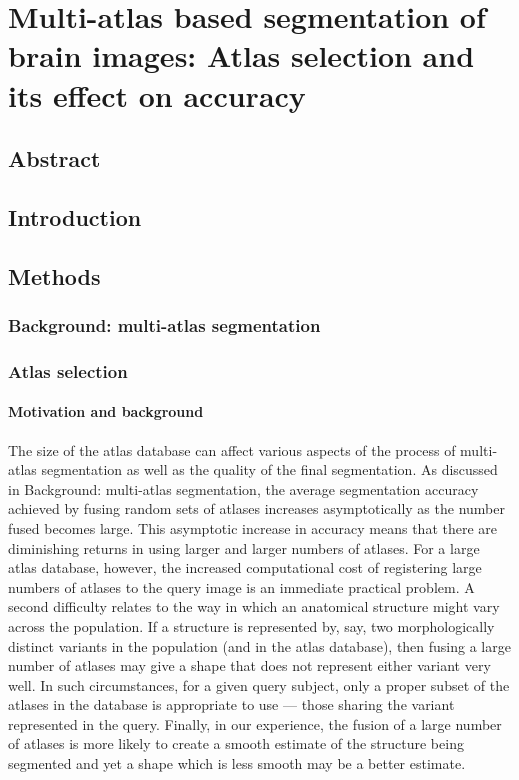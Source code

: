 
\chapter*{Multi-atlas based segmentation of brain images:
Atlas selection and its effect on accuracy}
\section*{Abstract}
\section*{Introduction}
\section*{Methods}
\subsection*{Background: multi-atlas segmentation}
\subsection*{Atlas selection}
\subsubsection*{Motivation and background}
The size of the atlas database can affect
various aspects of the process of multi-atlas segmentation
as well as the quality of the final segmentation.
As discussed in Background: multi-atlas segmentation,
the average segmentation accuracy 
achieved by fusing random sets of atlases increases asymptotically
as the number fused becomes large.
This asymptotic increase in accuracy means that
there are diminishing returns in using larger and larger numbers of atlases.
For a large atlas database, however,
the increased computational cost of registering
large numbers of atlases to the query image is an immediate practical problem.
A second difficulty relates to the way
in which an anatomical structure might vary across the population.
If a structure is represented by, say,
two morphologically distinct variants in the population
(and in the atlas database),
then fusing a large number of atlases may give a shape
that does not represent either variant very well.
In such circumstances, for a given query subject,
only a proper subset of the atlases in the database is appropriate to use
— those sharing the variant represented in the query.
Finally, in our experience,
the fusion of a large number of atlases
is more likely to create a smooth estimate of the structure
being segmented and yet a shape which is less smooth may be a better estimate.

